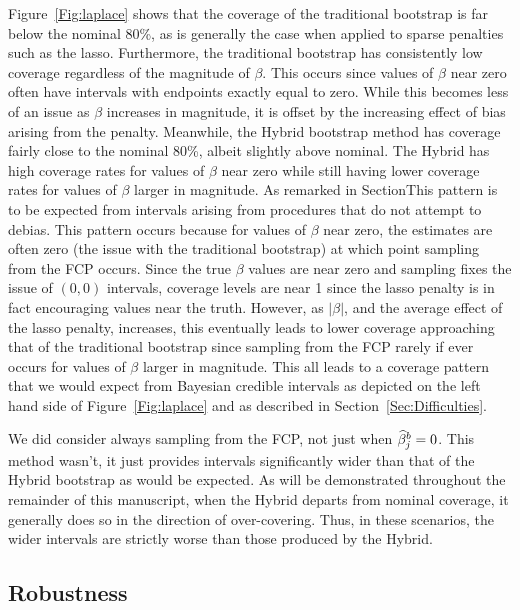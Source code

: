 Figure~\ref{Fig:laplace} shows that the coverage of the traditional bootstrap is far below the nominal 80\%, as is generally the case when applied to sparse penalties such as the lasso. Furthermore, the traditional bootstrap has consistently low coverage regardless of the magnitude of $\beta$. This occurs since values of $\beta$ near zero often have intervals with endpoints exactly equal to zero. While this becomes less of an issue as $\beta$ increases in magnitude, it is offset by the increasing effect of bias arising from the penalty.  Meanwhile, the Hybrid bootstrap method has coverage fairly close to the nominal 80\%, albeit slightly above nominal. The Hybrid has high coverage rates for values of $\beta$ near zero while still having lower coverage rates for values of $\beta$ larger in magnitude. As remarked in SectionThis pattern is to be expected from intervals arising from procedures that do not attempt to debias. This pattern occurs because for values of $\beta$ near zero, the estimates are often zero (the issue with the traditional bootstrap) at which point sampling from the FCP occurs. Since the true $\beta$ values are near zero and sampling fixes the issue of $(0, 0)$ intervals, coverage levels are near 1 since the lasso penalty is in fact encouraging values near the truth. However, as $|\beta|$, and the average effect of the lasso penalty, increases, this eventually leads to lower coverage approaching that of the traditional bootstrap since sampling from the FCP rarely if ever occurs for values of $\beta$ larger in magnitude. This all leads to a coverage pattern that we would expect from Bayesian credible intervals as depicted on the left hand side of Figure~\ref{Fig:laplace} and as described in Section~\ref{Sec:Difficulties}.

We did consider always sampling from the FCP, not just when $\widehat{\beta}_j^b = 0$. This method wasn't, it just provides intervals significantly wider than that of the Hybrid bootstrap as would be expected. As will be demonstrated throughout the remainder of this manuscript, when the Hybrid departs from nominal coverage, it generally does so in the direction of over-covering. Thus, in these scenarios, the wider intervals are strictly worse than those produced by the Hybrid.

\subsection{Robustness}
\label{Sec:robustness}

